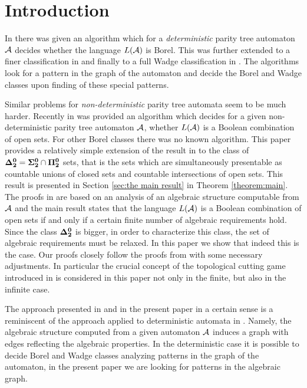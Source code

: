 
\section{Introduction}
In \cite{niwalu} there was given an algorithm which for a \emph{deterministic} parity tree automaton ${\mathcal A}$ decides whether the language $L({\mathcal A})$ is Borel. This was further extended to a finer classification in \cite{murlak2} and finally to a full Wadge classification in \cite{murlak}. The algorithms look for a pattern in the graph of the automaton and decide the Borel and Wadge classes upon finding of these special patterns. 

Similar problems for \emph{non-deterministic} parity tree automata seem to be much harder. 
Recently in \cite{bp} was provided an algorithm which decides for a given non-deterministic parity tree automaton ${\mathcal A}$, 
whether $L({\mathcal A})$ is a Boolean combination of open sets. For other Borel classes there was no known algorithm. This paper provides a relatively simple extension 
of the result in \cite{bp} to the class of ${\bf \Delta^0_2} = {\bf\Sigma^0_2}\cap{\bf\Pi^0_2}$ sets, that is the sets which are simultaneously presentable as countable unions of closed sets and countable intersections of open sets. This result is presented in Section \ref{sec:the main result} in Theorem \ref{theorem:main}. The proofs in \cite{bp} are based on an analysis of an algebraic structure computable from ${\mathcal A}$ and the main result states that the language $L({\mathcal A})$ is a Boolean combination of open sets if and only if a certain finite number of algebraic requirements hold. Since the class ${\bf \Delta^0_2}$ is bigger, in order to characterize this class, the set of algebraic requirements must be relaxed. In this paper we show that indeed this is the case. Our proofs closely follow the proofs from \cite{bp} with some necessary adjustments. In particular the crucial concept of the topological cutting game introduced in \cite{bp} is considered in this paper not only in the finite, but also in the infinite case. 

The approach presented in \cite{bp} and in the present paper in a certain sense is a reminiscent of the approach applied to deterministic automata in \cite{murlak2,murlak,niwalu}. Namely, the algebraic structure computed from a given automaton ${\mathcal A}$ induces a graph with edges reflecting the algebraic properties. In the deterministic case it is possible to decide Borel and Wadge classes analyzing patterns in the graph of the automaton, in the present paper we are looking for patterns in the algebraic graph. 

